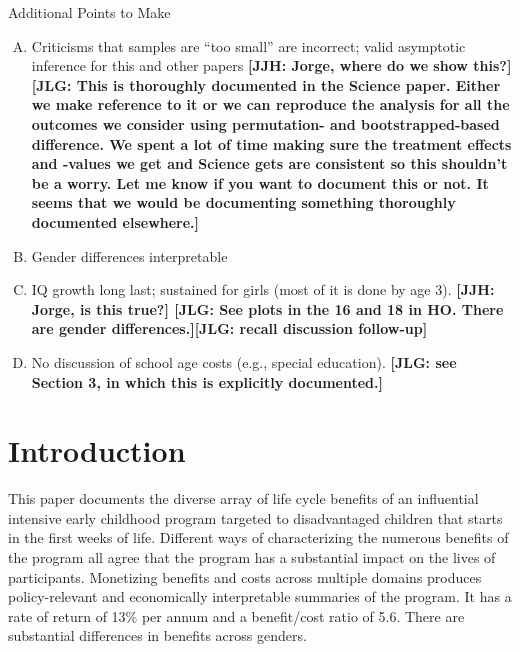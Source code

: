 \noindent Additional Points to Make
\begin{enumerate}[(A)]
\item Criticisms that samples are ``too small'' are incorrect; valid asymptotic inference for this and other papers \textbf{[JJH: Jorge, where do we show this?] [JLG: This is thoroughly documented in the Science paper. Either we make reference to it or we can reproduce the analysis for all the outcomes we consider using permutation- and bootstrapped-based difference. We spent a lot of time making sure the treatment effects and -values we get and Science gets are consistent so this shouldn't be a worry. Let me know if you want to document this or not. It seems that we would be documenting something thoroughly documented elsewhere.]}
\item Gender differences interpretable
\item IQ growth long last; sustained for girls (most of it is done by age 3). \textbf{[JJH: Jorge, is this true?] [JLG: See plots in the 16 and 18 in HO. There are gender differences.][JLG: recall discussion follow-up]}
\item No discussion of school age costs (e.g., special education). \textbf{[JLG: see Section 3, in which this is explicitly documented.]}
\end{enumerate}


\clearpage

\section{Introduction}

This paper documents the diverse array of life cycle benefits of an influential intensive early childhood program targeted to disadvantaged children that starts in the first weeks of life. Different ways of characterizing the numerous benefits of the program all agree that the program has a substantial impact on the lives of participants. Monetizing benefits and costs across multiple domains produces policy-relevant and economically interpretable summaries of the program. It has a rate of return of 13\% per annum and a benefit/cost ratio of 5.6. There are substantial differences in benefits across genders.

